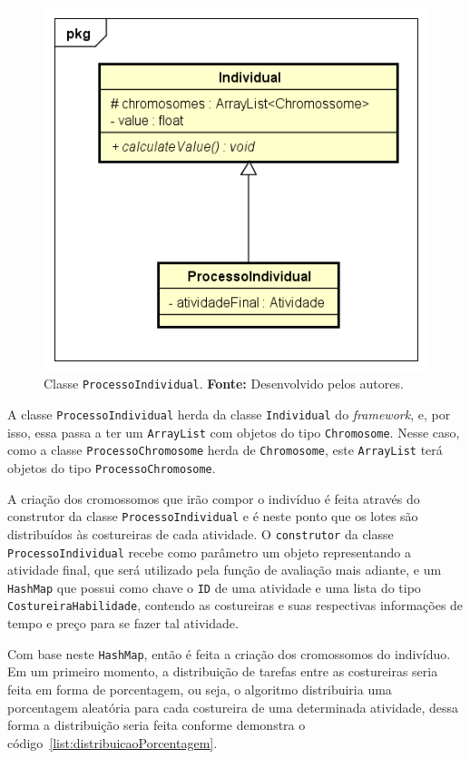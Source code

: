 \begin{figure}[h!]
	\centerline{\includegraphics[scale=0.7]{./imagens/class_individual.png}}
	\caption[Classe \texttt{ProcessoIndividual}.]
	{Classe \texttt{ProcessoIndividual}. \textbf{Fonte:} Desenvolvido pelos
	autores.}
	\label{fig:class_processoIndividual}
\end{figure}

\par A classe \texttt{ProcessoIndividual} herda da classe \texttt{Individual} do
\textit{framework}, e, por isso, essa passa a ter um \texttt{ArrayList} com
objetos do tipo \texttt{Chromosome}. Nesse caso, como a classe \texttt{ProcessoChromosome} herda de \texttt{Chromosome}, 
este \texttt{ArrayList} terá objetos do tipo \texttt{ProcessoChromosome}.

\par A criação dos cromossomos que irão compor o indivíduo é feita através do construtor da classe 
\texttt{ProcessoIndividual} e é neste ponto que os lotes são distribuídos às costureiras de cada atividade.
O \texttt{construtor} da classe \texttt{ProcessoIndividual} recebe como
parâmetro um objeto representando a atividade final, que será utilizado pela função de avaliação mais adiante, e um \texttt{HashMap} que possui como chave o \texttt{ID} de uma atividade e uma lista do  tipo \texttt{CostureiraHabilidade}, contendo as costureiras e suas respectivas informações de tempo e preço para se fazer tal atividade.

\par Com base neste \texttt{HashMap}, então é feita a criação dos cromossomos do indivíduo.
Em um primeiro momento, a distribuição de tarefas entre as costureiras seria feita em forma 
de porcentagem, ou seja, o algoritmo distribuiria uma porcentagem aleatória para cada costureira de 
uma determinada atividade, dessa forma a distribuição seria feita conforme demonstra o código~\ref{list:distribuicaoPorcentagem}.


